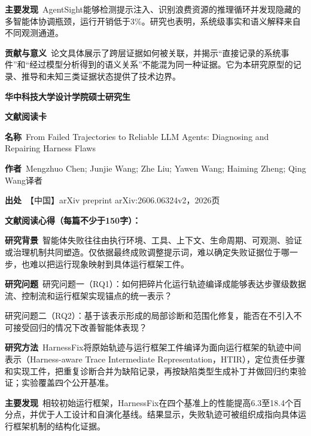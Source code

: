 \noindent\textbf{主要发现}\ AgentSight能够检测提示注入、识别浪费资源的推理循环并发现隐藏的多智能体协调瓶颈，运行开销低于3\%。研究也表明，系统级事实和语义解释来自不同观测通道。\par
\noindent\textbf{贡献与意义}\ 论文具体展示了跨层证据如何被关联，并揭示“直接记录的系统事件”和“经过模型分析得到的语义关系”不能混为同一种证据。它为本研究原型的记录、推导和未知三类证据状态提供了技术边界。\par
\clearpage
\begin{center}
{\songti\bfseries\fontsize{18.5pt}{27.75pt}\selectfont 华中科技大学设计学院硕士研究生\par}
{\songti\bfseries\fontsize{18.5pt}{27.75pt}\selectfont 文献阅读卡\par}
\end{center}
\vspace{0.25em}
\noindent\underline{}\par
\vspace{0.35em}
\noindent\textbf{名称}\ From Failed Trajectories to Reliable LLM Agents: Diagnosing and Repairing Harness Flaws\par
\noindent\textbf{作者}\ Mengzhuo Chen; Junjie Wang; Zhe Liu; Yawen Wang; Haiming Zheng; Qing Wang\quad 译者\par
\noindent\textbf{出处}\ 【中国】arXiv preprint arXiv:2606.06324v2，2026\quad 页\par
\vspace{0.35em}
\noindent\textbf{文献阅读心得（每篇不少于150字）：}\par
\noindent\textbf{研究背景}\ 智能体失败往往由执行环境、工具、上下文、生命周期、可观测、验证或治理机制共同塑造。仅依据最终成败调整提示词，难以确定失败证据位于哪一步，也难以把运行现象映射到具体运行框架工件。\par
\noindent\textbf{研究问题}\ 研究问题一（RQ1）：如何把碎片化运行轨迹编译成能够表达步骤级数据流、控制流和运行框架实现锚点的统一表示？\par
研究问题二（RQ2）：基于该表示形成的局部诊断和范围化修复，能否在不引入不可接受回归的情况下改善智能体表现？\par
\noindent\textbf{研究方法}\ HarnessFix将原始轨迹与运行框架工件编译为面向运行框架的轨迹中间表示（Harness-aware Trace Intermediate Representation，HTIR），定位责任步骤和实现工件，把重复诊断合并为缺陷记录，再按缺陷类型生成补丁并做回归约束验证；实验覆盖四个公开基准。\par
\noindent\textbf{主要发现}\ 相较初始运行框架，HarnessFix在四个基准上的性能提高6.3至18.4个百分点，并优于人工设计和自演化基线。结果显示，失败轨迹可被组织成指向具体运行框架机制的结构化证据。\par
